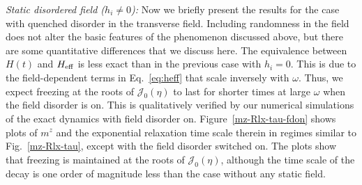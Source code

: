 \documentclass[reprint,preprintnumbers,showpacs,amsmath,twocolumn,showkeys,aps,prl]{revtex4-1}
\begin{document}
\noindent
{\it Static disordered field ($h_i\neq 0$):}
Now we briefly present the results for the case with quenched disorder in the transverse field.
Including randomness in the field does not alter the basic features of the phenomenon discussed above, 
but there are some quantitative differences that we discuss here. The equivalence between $H(t)$ and $H_{\rm eff}$
is less exact than in the previous case with $h_i=0$. This is due to the field-dependent terms in Eq.~\ref{eq:heff} that scale inversely with $\omega$. Thus, we expect freezing at the roots of $\mathcal{J}_0(\eta)$ to last for shorter times at large $\omega$ when the field disorder is on. This is qualitatively verified by our numerical simulations of the 
exact dynamics with field disorder on. Figure~\ref{mz-Rlx-tau-fdon} shows plots of $m^z$ and the 
exponential relaxation time scale therein in regimes similar to Fig.~\ref{mz-Rlx-tau}, except with 
the field disorder switched on. The plots show that freezing is maintained at the roots of 
$\mathcal{J}_0(\eta)$, although the time scale of the decay is one order of magnitude less than the 
case without any static field.
\end{document}
